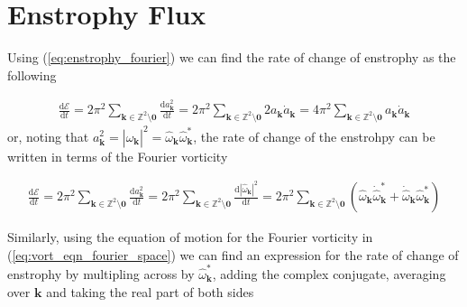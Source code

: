 \documentclass[9pt]{article}
\newcommand{\der}[2]{\frac{\mathrm{d}#1}{\mathrm{d}#2}}          	 %
\newcommand{\omegahat}[1]{\hat{\omega}_{ \mathbf{#1} } }								%
\newcommand{\bfk}{\mathbf{k}}								%
\begin{document}
\section{Enstrophy Flux}

Using (\ref{eq:enstrophy_fourier}) we can find the rate of change of enstrophy as the following

\begin{align}
\der{\mathcal{E}}{t} = 2\pi^2 \sum_{\mathbf{k}\in \mathbb{Z}^2\setminus \mathbf{0}} \der{a_{\bfk}^2}{t}  = 2\pi^2 \sum_{\mathbf{k}\in \mathbb{Z}^2\setminus \mathbf{0}} 2 a_{\bfk} \dot{a}_{\bfk} = 4\pi^2 \sum_{\mathbf{k}\in \mathbb{Z}^2\setminus \mathbf{0}} a_{\bfk} \dot{a}_{\bfk}
\end{align}
or, noting that $a_{\bfk}^2 = |\hat{\omega}_{\bfk}|^2 = \hat{\omega}_{\bfk}\hat{\omega}_{\bfk}^{*}$, the rate of change of the enstrohpy can be written in terms of the Fourier vorticity


\begin{align}
	\der{\mathcal{E}}{t} = 2\pi^2 \sum_{\mathbf{k}\in \mathbb{Z}^2\setminus \mathbf{0}} \der{a_{\bfk}^2}{t} = 2\pi^2 \sum_{\mathbf{k}\in \mathbb{Z}^2\setminus \mathbf{0}}\der{|\hat{\omega}_{\bfk}|^2}{t} = 2\pi^2 \sum_{\mathbf{k}\in \mathbb{Z}^2\setminus \mathbf{0}} (\hat{\omega}_{\bfk} \dot{\hat{\omega}}^{*}_{\bfk} + \dot{\hat{\omega}}_{\bfk} \hat{\omega}^{*}_{\bfk})
\end{align}

Similarly, using the equation of motion for the Fourier vorticity in (\ref{eq:vort_eqn_fourier_space}) we can find an expression for the rate of change of enstrophy by multipling across by $\omegahat{k}^*$, adding the complex conjugate, averaging over $\bfk$ and taking the real part of both sides
\end{document}
